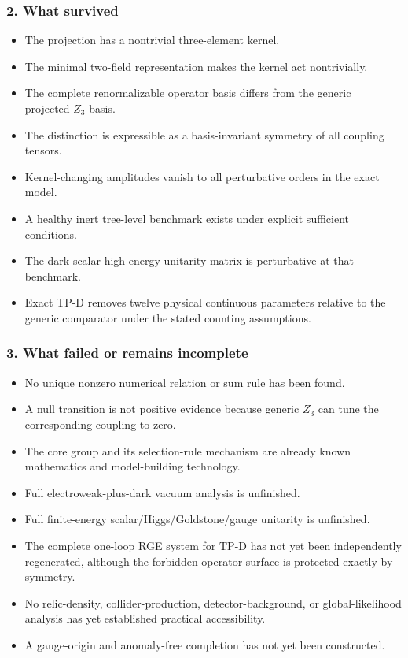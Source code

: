 \documentclass[
]{article}
\providecommand{\tightlist}{%
  \setlength{\itemsep}{0pt}\setlength{\parskip}{0pt}}
\begin{document}
\hypertarget{what-survived}{%
\subsubsection{2. What survived}\label{what-survived}}

\begin{itemize}
\tightlist
\item
  The projection has a nontrivial three-element kernel.
\item
  The minimal two-field representation makes the kernel act
  nontrivially.
\item
  The complete renormalizable operator basis differs from the generic
  projected-\(Z_3\) basis.
\item
  The distinction is expressible as a basis-invariant symmetry of all
  coupling tensors.
\item
  Kernel-changing amplitudes vanish to all perturbative orders in the
  exact model.
\item
  A healthy inert tree-level benchmark exists under explicit sufficient
  conditions.
\item
  The dark-scalar high-energy unitarity matrix is perturbative at that
  benchmark.
\item
  Exact TP-D removes twelve physical continuous parameters relative to
  the generic comparator under the stated counting assumptions.
\end{itemize}

\hypertarget{what-failed-or-remains-incomplete}{%
\subsubsection{3. What failed or remains
incomplete}\label{what-failed-or-remains-incomplete}}

\begin{itemize}
\tightlist
\item
  No unique nonzero numerical relation or sum rule has been found.
\item
  A null transition is not positive evidence because generic \(Z_3\) can
  tune the corresponding coupling to zero.
\item
  The core group and its selection-rule mechanism are already known
  mathematics and model-building technology.
\item
  Full electroweak-plus-dark vacuum analysis is unfinished.
\item
  Full finite-energy scalar/Higgs/Goldstone/gauge unitarity is
  unfinished.
\item
  The complete one-loop RGE system for TP-D has not yet been
  independently regenerated, although the forbidden-operator surface is
  protected exactly by symmetry.
\item
  No relic-density, collider-production, detector-background, or
  global-likelihood analysis has yet established practical
  accessibility.
\item
  A gauge-origin and anomaly-free completion has not yet been
  constructed.
\end{itemize}
\end{document}
